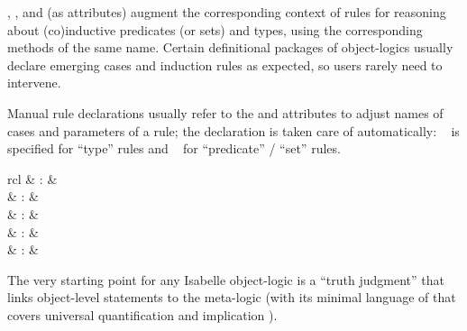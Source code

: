 \begin{isabellebody}
\begin{isamarkuptext}
\begin{descr}
  \item [\hyperlink{attribute.cases}{\mbox{\isa{cases}}}, \hyperlink{attribute.induct}{\mbox{\isa{induct}}}, and \hyperlink{attribute.coinduct}{\mbox{\isa{coinduct}}}] (as attributes) augment the corresponding context of
  rules for reasoning about (co)inductive predicates (or sets) and
  types, using the corresponding methods of the same name.  Certain
  definitional packages of object-logics usually declare emerging
  cases and induction rules as expected, so users rarely need to
  intervene.
  
  Manual rule declarations usually refer to the \hyperlink{attribute.case_names}{\mbox{}} and \hyperlink{attribute.params}{\mbox{}} attributes to adjust names of
  cases and parameters of a rule; the \hyperlink{attribute.consumes}{\mbox{}}
  declaration is taken care of automatically: \hyperlink{attribute.consumes}{\mbox{}}~ is specified for ``type'' rules and \hyperlink{attribute.consumes}{\mbox{}}~ for ``predicate'' / ``set'' rules.

  \end{descr}%
\end{isamarkuptext}%
\isamarkuptrue%
%
\isamarkuptrue%
%
\begin{isamarkuptext}%
\begin{matharray}{rcl}
    \hypertarget{command.judgment}{\hyperlink{command.judgment}{\mbox{}}} & : &  \\
    \hypertarget{method.atomize}{\hyperlink{method.atomize}{\mbox{}}} & : & \isarmeth \\
    \hypertarget{attribute.atomize}{\hyperlink{attribute.atomize}{\mbox{}}} & : & \isaratt \\
    \hypertarget{attribute.rule_format}{\hyperlink{attribute.rule_format}{\mbox{}}} & : & \isaratt \\
    \hypertarget{attribute.rulify}{\hyperlink{attribute.rulify}{\mbox{}}} & : & \isaratt \\
  \end{matharray}

  The very starting point for any Isabelle object-logic is a ``truth
  judgment'' that links object-level statements to the meta-logic
  (with its minimal language of  that covers universal
  quantification \isa{{\isachardoublequote}{\isasymAnd}{\isachardoublequote}} and implication \isa{{\isachardoublequote}{\isasymLongrightarrow}{\isachardoublequote}}).


\end{isamarkuptext}
\end{isabellebody}
